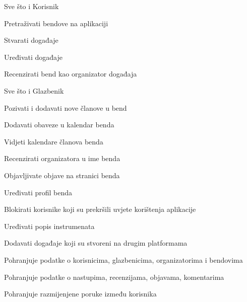 \begin{packed_enum}
		\item  {}
			
			\begin{packed_enum}
				
				\item Sve što i Korisnik
				\item Pretraživati bendove na aplikaciji
				\item Stvarati događaje
				\item Uređivati događaje
				\item Recenzirati bend kao organizator događaja
			\end{packed_enum}
			
		\item  {}
			
			\begin{packed_enum}
				
				\item Sve što i Glazbenik
				\item Pozivati i dodavati nove članove u bend
				\item Dodavati obaveze u kalendar benda
				\item Vidjeti kalendare članova benda
				\item Recenzirati organizatora u ime benda
				\item Objavljivate objave na stranici benda
				\item Uređivati profil benda
			\end{packed_enum}
			
		\item  {}
			
			\begin{packed_enum}
				
				\item Blokirati korisnike koji su prekršili uvjete korištenja aplikacije
				\item Uređivati popis instrumenata
				\item Dodavati događaje koji su stvoreni na drugim platformama
				
			\end{packed_enum}
			
		\item  {}
			
			\begin{packed_enum}
				
				\item Pohranjuje podatke o korisnicima, glazbenicima, organizatorima i bendovima
				\item Pohranjuje podatke o nastupima, recenzijama, objavama, komentarima
				\item Pohranjuje razmijenjene poruke između korisnika 
				
			\end{packed_enum}
		
		\end{packed_enum}
			
